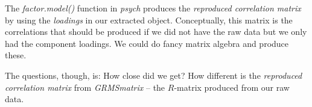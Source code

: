 \documentclass[
  english,
]{book}
\newenvironment{Shaded}{\begin{snugshade}}{\end{snugshade}}
\newcommand{\CommentTok}[1]{\textcolor[rgb]{0.56,0.35,0.01}{\textit{#1}}}
\newcommand{\DecValTok}[1]{\textcolor[rgb]{0.00,0.00,0.81}{#1}}
\newcommand{\KeywordTok}[1]{\textcolor[rgb]{0.13,0.29,0.53}{\textbf{#1}}}
\newcommand{\NormalTok}[1]{#1}
\newcommand{\OperatorTok}[1]{\textcolor[rgb]{0.81,0.36,0.00}{\textbf{#1}}}
\begin{document}
The \emph{factor.model()} function in \emph{psych} produces the \emph{reproduced correlation matrix} by using the \emph{loadings} in our extracted object. Conceptually, this matrix is the correlations that should be produced if we did not have the raw data but we only had the component loadings. We could do fancy matrix algebra and produce these.

The questions, though, is: How close did we get? How different is the \emph{reproduced correlation matrix} from \emph{GRMSmatrix} -- the \(R\)-matrix produced from our raw data.

\begin{Shaded}
\end{Shaded}
\end{document}
